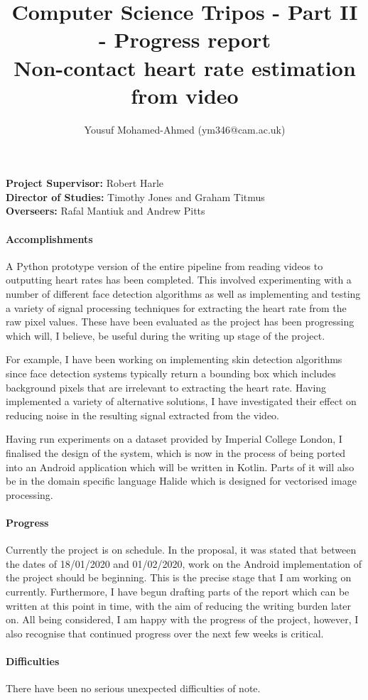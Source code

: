 \documentclass{article}
\title{Computer Science Tripos - Part II - Progress report\\
\textbf{Non-contact heart rate estimation from video}}
\author{Yousuf Mohamed-Ahmed \vspace{3ex} (ym346@cam.ac.uk)}
\begin{document}
\date{\vspace{-5ex}}
\maketitle
 \noindent
\textbf{Project Supervisor:} Robert Harle \\
\textbf{Director of Studies:} Timothy Jones and Graham Titmus \\
\textbf{Overseers:} Rafal Mantiuk and Andrew Pitts 

\paragraph{Accomplishments}
A Python prototype version of the entire pipeline from reading videos to outputting heart rates has been completed.
This involved experimenting with a number of different face detection algorithms as well as implementing and testing a variety of 
signal processing techniques for extracting the heart rate from the raw pixel values. These have been evaluated as the project has been progressing which will, I believe, be useful during the writing up stage of the project. 

For example, I have been working on implementing skin detection algorithms since face detection systems typically return a bounding box which includes background pixels that are irrelevant to extracting the heart rate. Having implemented a variety of alternative solutions, I have investigated their effect on reducing noise in the resulting signal extracted from the video.

Having run experiments on a dataset provided by Imperial College London, I finalised the design of the system, which is now in the process of being ported into an Android application which will be written in Kotlin. Parts of it will also be in the domain specific language Halide which is designed for vectorised image processing. 


\paragraph{Progress}
Currently the project is on schedule. In the proposal, it was stated that between the dates of 18/01/2020 and 01/02/2020, work on the Android implementation of the project should be beginning. This is the precise stage that I am working on currently. Furthermore, I have begun drafting parts of the report which can be written at this point in time, with the aim of reducing the writing burden later on. All being considered, I am happy with the progress of the project, however, I also recognise that continued progress over the next few weeks is critical.

\paragraph{Difficulties}
There have been no serious unexpected difficulties of note. 
\end{document}

